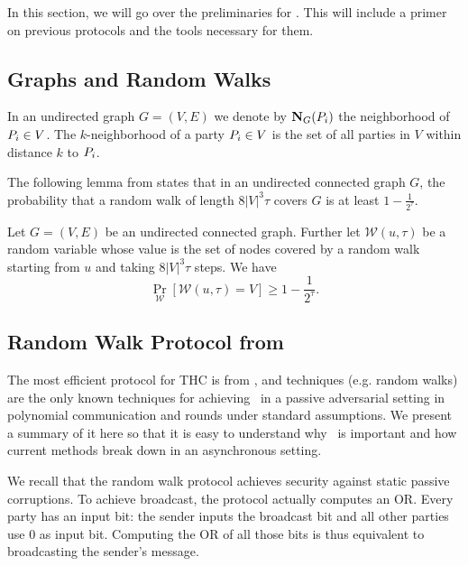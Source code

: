 In this section, we will go over the preliminaries for \THC. This will include a primer on previous protocols and the tools necessary for them. 

\subsection{Graphs and Random Walks}
In an undirected graph $G = (V,E)$ we denote by $\mathbf{N}_G(P_i)$ the neighborhood of $P_i \in V$. The $k$-neighborhood of a party $P_i \in V$ is the set of all parties in $V$ within distance $k$ to $P_i$.

The following lemma from \cite{C:AkaLaVMor17} states that in an undirected connected graph $G$, the probability that a random walk of length $8|V|^3 \tau$ covers $G$ is at least $1- \frac{1}{2^\tau}$. 

\begin{lemma}\label{lem:randomWalkCover}
	Let $G = (V,E)$ be an undirected connected graph. Further let $\mathcal{W}(u,\tau)$ be a random variable whose value is the set of nodes covered by a random walk starting from $u$ and taking $8|V|^3 \tau$  steps. We have
	\begin{equation*}
	\Pr_\mathcal{W}[\mathcal{W}(u,\tau) = V] \ge 1- \frac{1}{2^\tau}.
	\end{equation*} 
\end{lemma}

\subsection{Random Walk Protocol from \texorpdfstring{\cite{C:AkaLaVMor17}}{[ALM17a]}}\label{sec:RandomWalks}

The most efficient protocol for THC is from \cite{C:AkaLaVMor17}, and techniques (e.g. random walks) are the only known techniques for achieving \THC~in a passive adversarial setting in polynomial communication and rounds under standard assumptions. We present a summary of it here so that it is easy to understand why \PKCR~is important and how current methods break down in an asynchronous setting.

We recall that the random walk protocol achieves security against static passive corruptions. To achieve broadcast, the protocol actually computes an OR.  Every party has an input bit: the sender inputs the broadcast bit and all other parties use 0 as input bit. Computing the OR of all those bits is thus equivalent to broadcasting the sender's message.

